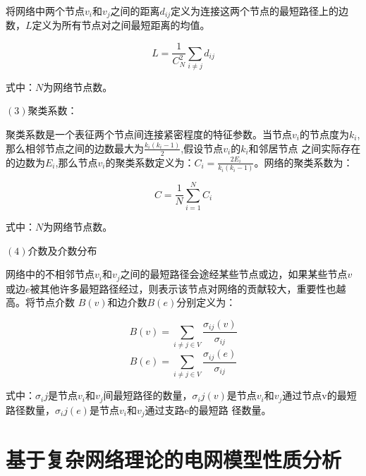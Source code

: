 将网络中两个节点$v_i$和$v_j$之间的距离$d_{ij}$定义为连接这两个节点的最短路径上的边数，$L$定义为所有节点对之间最短距离的均值。

\begin{equation}
    \label{equ:chap3:feature}
    L=\frac{1}{C_N^2} \sum_{i \neq j} d_{i j}
\end{equation}

式中：$N$为网络节点数。

$(3)$聚类系数：

聚类系数是一个表征两个节点间连接紧密程度的特征参数。当节点$v_i$的节点度为$k_i$,那么相邻节点之间的边数最大为$\frac{k_i(k_i-1)}{2}$,假设节点$v_i$的$k_i$和邻居节点
之间实际存在的边数为$E_i$,那么节点$v_i$的聚类系数定义为：$C_i=\frac{2E_i}{k_i(k_i-1)}$。网络的聚类系数为：

\begin{equation} 
    \label{equ:chap3:feature}
    C=\frac{1}{N} \sum_{i=1}^N C_i
\end{equation}

式中：$N$为网络节点数。

$(4)$介数及介数分布

网络中的不相邻节点$v_i$和$v_j$之间的最短路径会途经某些节点或边，如果某些节点$v$或边$e$被其他许多最短路径经过，则表示该节点对网络的贡献较大，重要性也越高。将节点介数
$B(v)$和边介数$B(e)$分别定义为：

\begin{equation} 
    \label{equ:chap3:feature}
    B(v)=\sum_{i \neq j\in V} \frac{\sigma_{ij}(v)}{\sigma_{ij}} 
\end{equation}
\begin{equation} 
    \label{equ:chap3:feature}
    B(e)=\sum_{i \neq j\in V} \frac{\sigma_{ij}(e)}{\sigma_{ij}} 
\end{equation}

式中：$\sigma_ij$是节点$v_i$和$v_j$间最短路径的数量，$\sigma_ij(v)$是节点$v_i$和$v_j$通过节点v的最短路径数量，$\sigma_ij(e)$是节点$v_i$和$v_j$通过支路e的最短路
径数量。

\section{基于复杂网络理论的电网模型性质分析}
\label{sec:wind}

